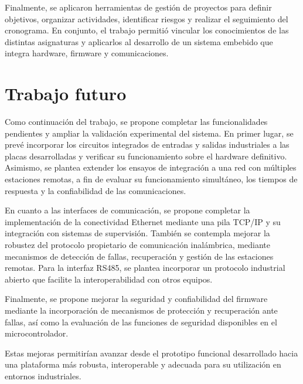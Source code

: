 Finalmente, se aplicaron herramientas de gestión de proyectos para definir objetivos, organizar actividades, identificar riesgos y realizar el seguimiento del cronograma. En conjunto, el trabajo permitió vincular los conocimientos de las distintas asignaturas y aplicarlos al desarrollo de un sistema embebido que integra hardware, firmware y comunicaciones.

\section{Trabajo futuro}

Como continuación del trabajo, se propone completar las funcionalidades pendientes y ampliar la validación experimental del sistema. En primer lugar, se prevé incorporar los circuitos integrados de entradas y salidas industriales a las placas desarrolladas y verificar su funcionamiento sobre el hardware definitivo. Asimismo, se plantea extender los ensayos de integración a una red con múltiples estaciones remotas, a fin de evaluar su funcionamiento simultáneo, los tiempos de respuesta y la confiabilidad de las comunicaciones.

En cuanto a las interfaces de comunicación, se propone completar la implementación de la conectividad Ethernet mediante una pila TCP/IP y su integración con sistemas de supervisión. También se contempla mejorar la robustez del protocolo propietario de comunicación inalámbrica, mediante mecanismos de detección de fallas, recuperación y gestión de las estaciones remotas. Para la interfaz RS485, se plantea incorporar un protocolo industrial abierto que facilite la interoperabilidad con otros equipos.

Finalmente, se propone mejorar la seguridad y confiabilidad del firmware mediante la incorporación de mecanismos de protección y recuperación ante fallas, así como la evaluación de las funciones de seguridad disponibles en el microcontrolador.

Estas mejoras permitirían avanzar desde el prototipo funcional desarrollado hacia una plataforma más robusta, interoperable y adecuada para su utilización en entornos industriales.

